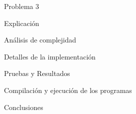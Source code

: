 \documentclass[12pt,titlepage]{article}
\begin{document}
	\newpage

	\begin{section}{Problema 3}
		
		\begin{subsection}{Explicación}
			
			\begin{subsubsection}{Análisis de complejidad}

			\end{subsubsection}
		\end{subsection}
		
		\begin{subsection}{Detalles de la implementación}
		
		\end{subsection}
	
		\begin{subsection}{Pruebas y Resultados}
		
		\end{subsection}

	\end{section}
	
	\newpage
	
	\begin{section}{Compilación y ejecución de los programas}
	
	\end{section}
	
	\begin{section}{Conclusiones}

	\end{section}
\end{document}
